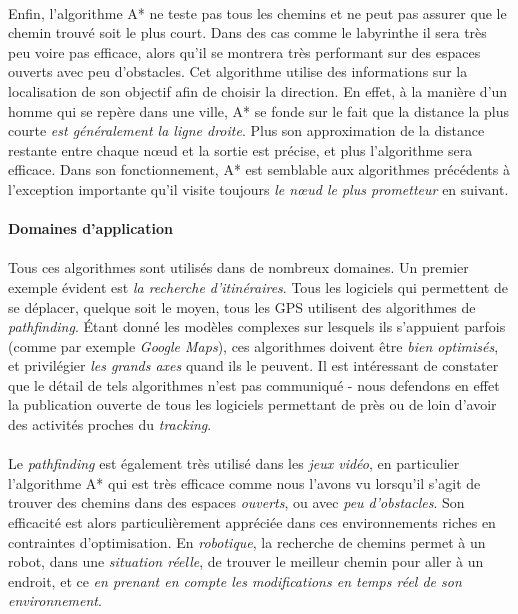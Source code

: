 \paragraph{} Enfin, l'algorithme A* ne teste pas tous les chemins et ne peut pas assurer que le chemin trouvé soit le
plus court. Dans des cas comme le labyrinthe il sera très peu voire pas efficace, alors qu'il se montrera très performant
sur des espaces ouverts avec peu d'obstacles. Cet algorithme utilise des informations sur la localisation de son
objectif afin de choisir la direction. En effet, à la manière d'un homme qui se repère dans une ville, A* se fonde sur le
fait que la distance la plus courte \emph{est généralement la ligne droite}. Plus son approximation de la distance 
restante entre chaque n\oe{}ud et la sortie est précise, et plus l'algorithme sera efficace. Dans son fonctionnement, A*
est semblable aux algorithmes précédents à l'exception importante qu'il visite toujours \emph{le n\oe{}ud le plus
prometteur} en suivant.

\paragraph{Domaines d'application}

\paragraph{} Tous ces algorithmes sont utilisés dans de nombreux domaines. Un premier exemple évident
est \emph{la recherche d'itinéraires}. Tous les logiciels qui permettent de se déplacer, quelque soit le moyen,
tous les GPS utilisent des algorithmes de \emph{pathfinding}. Étant donné les modèles complexes sur lesquels
ils s'appuient parfois (comme par exemple \emph{Google Maps}), ces algorithmes doivent être \emph{bien optimisés},
et privilégier \emph{les grands axes} quand ils le peuvent. Il est intéressant de constater que le détail de tels
algorithmes n'est pas communiqué - nous defendons en effet la publication ouverte de tous les logiciels permettant de près
ou de loin d'avoir des activités proches du \emph{tracking}.

\paragraph{} Le \emph{pathfinding} est également très utilisé dans les \emph{jeux vidéo}, en particulier l'algorithme A*
qui est très efficace comme nous l'avons vu lorsqu'il s'agit de trouver des chemins dans des espaces \emph{ouverts}, ou
avec \emph{peu d'obstacles}. Son efficacité est alors particulièrement appréciée dans ces environnements riches en contraintes 
d'optimisation. En \emph{robotique}, la recherche de chemins permet à un robot, dans une \emph{situation réelle}, de trouver
le meilleur chemin pour aller à un endroit, et ce \emph{en prenant en compte les modifications en temps réel de son environnement}.

